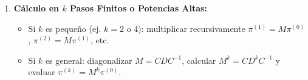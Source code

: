 \documentclass[11pt,a4paper]{article}
\theoremstyle{definition}
\begin{document}
\begin{enumerate}[label=\textbf{Paso \arabic*:}]
    \item \textbf{Cálculo en $k$ Pasos Finitos o Potencias Altas:}
          \begin{itemize}
              \item Si $k$ es pequeño (ej. $k=2$ o $4$): multiplicar recursivamente $\pi^{(1)} = M
                        \pi^{(0)}$, $\pi^{(2)} = M \pi^{(1)}$, etc.
              \item Si $k$ es general: diagonalizar $M = C D C^{-1}$, calcular $M^k = C D^k C^{-1}$
                    y evaluar $\pi^{(k)} = M^k \pi^{(0)}$.
          \end{itemize}
\end{enumerate}
\end{document}
